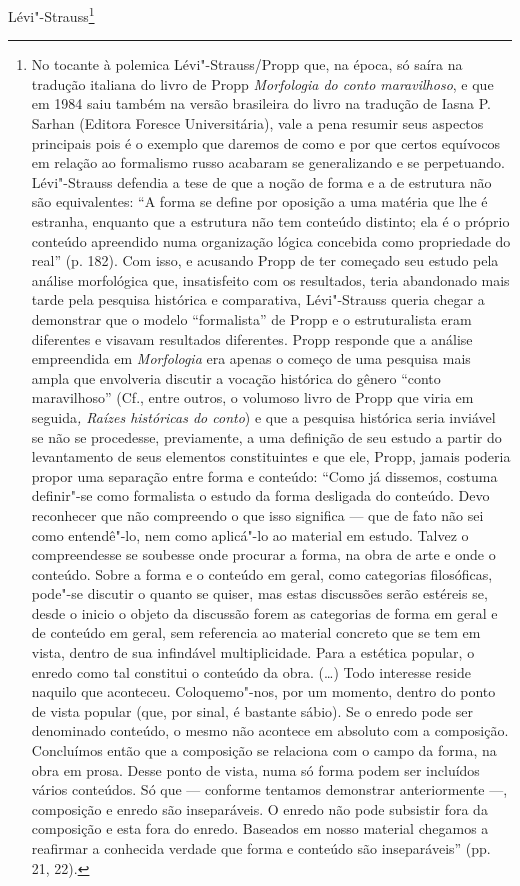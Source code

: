 Lévi"-Strauss\footnote{No tocante à polemica Lévi"-Strauss/Propp que, na
  época, só saíra na tradução italiana do livro de Propp
  \emph{Morfologia do conto maravilhoso}, e que em 1984 saiu também na
  versão brasileira do livro na tradução de Iasna P. Sarhan (Editora
  Foresce Universitária), vale a pena
  resumir seus aspectos principais pois é o exemplo que daremos de como
  e por que certos equívocos em relação ao formalismo russo acabaram se
  generalizando e se perpetuando. Lévi"-Strauss defendia a tese de que a
  noção de forma e a de estrutura não são equivalentes: ``A forma se
  define por oposição a uma matéria que lhe é estranha, enquanto que a
  estrutura não tem conteúdo distinto; ela é o próprio conteúdo
  apreendido numa organização lógica concebida como propriedade do
  real'' (p. 182). Com isso, e acusando Propp de ter começado seu estudo
  pela análise morfológica que, insatisfeito com os resultados, teria
  abandonado mais tarde pela pesquisa histórica e comparativa,
  Lévi"-Strauss queria chegar a demonstrar que o modelo ``formalista'' de
  Propp e o estruturalista eram diferentes e visavam resultados
  diferentes. Propp responde que a análise empreendida em
  \emph{Morfologia} era apenas o começo de uma pesquisa mais ampla que
  envolveria discutir a vocação histórica do gênero ``conto
  maravilhoso'' (Cf., entre outros, o volumoso livro de Propp que viria
  em seguida\emph{, Raízes históricas do conto}) e que a pesquisa
  histórica seria inviável se não se procedesse, previamente, a uma
  definição de seu estudo a partir do levantamento de seus elementos
  constituintes e que ele, Propp, jamais poderia propor uma separação
  entre forma e conteúdo: ``Como já dissemos, costuma definir"-se como
  formalista o estudo da forma desligada do conteúdo. Devo reconhecer
  que não compreendo o que isso significa --- que de fato não sei como
  entendê"-lo, nem como aplicá"-lo ao material em estudo. Talvez o compreendesse se soubesse
  onde procurar a forma, na obra de arte e onde o conteúdo. Sobre a
  forma e o conteúdo em geral, como categorias filosóficas, pode"-se
  discutir o quanto se quiser, mas estas discussões serão estéreis se,
  desde o inicio o objeto da discussão forem as categorias de forma em
  geral e de conteúdo em geral, sem referencia ao material concreto que
  se tem em vista, dentro de sua infindável multiplicidade. Para a
  estética popular, o enredo como tal constitui o conteúdo da obra.
  (\ldots{}) Todo interesse reside naquilo que aconteceu. Coloquemo"-nos,
  por um momento, dentro do ponto de vista popular (que, por sinal, é
  bastante sábio). Se o enredo pode ser denominado conteúdo, o mesmo não
  acontece em absoluto com a composição. Concluímos então que a
  composição se relaciona com o campo da forma, na obra em prosa. Desse ponto de vista,
  numa só forma podem ser incluídos vários conteúdos. Só que --- conforme
  tentamos demonstrar anteriormente ---, composição e enredo são
  inseparáveis. O enredo não pode subsistir fora da composição e esta
  fora do enredo. Baseados em nosso material chegamos a reafirmar a
  conhecida verdade que forma e conteúdo são inseparáveis'' (pp. 21,
  22).

}
